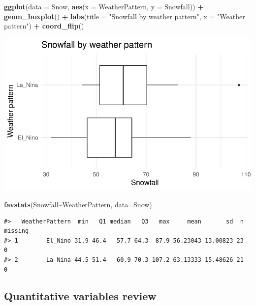 \documentclass[
]{report}
\newenvironment{Shaded}{\begin{snugshade}}{\end{snugshade}}
\newcommand{\DataTypeTok}[1]{\textcolor[rgb]{0.13,0.29,0.53}{#1}}
\newcommand{\KeywordTok}[1]{\textcolor[rgb]{0.13,0.29,0.53}{\textbf{#1}}}
\newcommand{\NormalTok}[1]{#1}
\newcommand{\OperatorTok}[1]{\textcolor[rgb]{0.81,0.36,0.00}{\textbf{#1}}}
\newcommand{\StringTok}[1]{\textcolor[rgb]{0.31,0.60,0.02}{#1}}
\begin{document}
\begin{Shaded}
\begin{Highlighting}[]
\KeywordTok{ggplot}\NormalTok{(}\DataTypeTok{data =}\NormalTok{ Snow,}
       \KeywordTok{aes}\NormalTok{(}\DataTypeTok{x =}\NormalTok{ WeatherPattern, }\DataTypeTok{y =}\NormalTok{ Snowfall)) }\OperatorTok{+}
\StringTok{    }\KeywordTok{geom\_boxplot}\NormalTok{() }\OperatorTok{+}\StringTok{ }
\StringTok{    }\KeywordTok{labs}\NormalTok{(}\DataTypeTok{title =} \StringTok{"Snowfall by weather pattern"}\NormalTok{,}
         \DataTypeTok{x =} \StringTok{"Weather pattern"}\NormalTok{) }\OperatorTok{+}
\StringTok{    }\KeywordTok{coord\_flip}\NormalTok{()}
\end{Highlighting}
\end{Shaded}

\begin{center}\includegraphics[width=0.6\linewidth]{09-inference-2quant_files/figure-latex/unnamed-chunk-2-1} \end{center}

\begin{Shaded}
\begin{Highlighting}[]
\KeywordTok{favstats}\NormalTok{(Snowfall}\OperatorTok{\textasciitilde{}}\NormalTok{WeatherPattern, }\DataTypeTok{data=}\NormalTok{Snow)}
\end{Highlighting}
\end{Shaded}

\begin{verbatim}
#>   WeatherPattern  min   Q1 median   Q3   max     mean       sd  n missing
#> 1        El_Nino 31.9 46.4   57.7 64.3  87.9 56.23043 13.00823 23       0
#> 2        La_Nina 44.5 51.4   60.9 70.3 107.2 63.13333 15.48626 21       0
\end{verbatim}

\hypertarget{quantitative-variables-review}{%
\subsection{Quantitative variables review}\label{quantitative-variables-review}}
\end{document}
